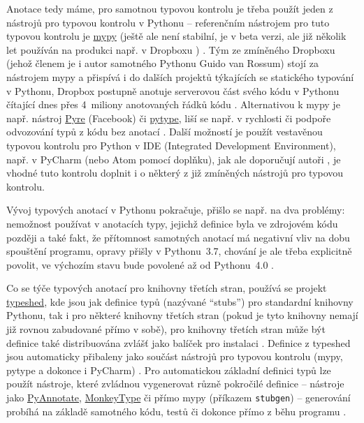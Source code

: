 Anotace tedy máme, pro samotnou typovou kontrolu je třeba použít jeden z nástrojů pro typovou kontrolu v Pythonu -- referenčním nástrojem pro tuto typovou kontrolu je \href{http://mypy-lang.org/}{mypy} (ještě ale není stabilní, je v beta verzi, ale již několik let používán na produkci např. v Dropboxu \cite{mypy}) \cite{types-python-bernat}. Tým ze zmíněného Dropboxu (jehož členem je i autor samotného Pythonu Guido van Rossum) stojí za nástrojem mypy a přispívá i do dalších projektů týkajících se statického typování v Pythonu, Dropbox postupně anotuje serverovou část svého kódu v Pythonu čítající dnes přes 4~miliony anotovaných řádků kódu \cite{types-python-dropbox}. Alternativou k mypy je např. nástroj \href{https://github.com/facebook/pyre-check}{Pyre} (Facebook) či \href{https://github.com/google/pytype}{pytype}, liší se např. v rychlosti či podpoře odvozování typů z kódu bez anotací \cite{types-python-bernat, types-python-realpython}. Další možností je použít vestavěnou typovou kontrolu pro Python v IDE (Integrated Development Environment), např. v PyCharm (nebo Atom pomocí doplňku), jak ale doporučují autoři \cite{types-python-bernat, types-python-medium}, je vhodné tuto kontrolu doplnit i o některý z již zmíněných nástrojů pro typovou kontrolu.

Vývoj typových anotací v Pythonu pokračuje, přišlo se např. na dva problémy: nemožnost používat v anotacích typy, jejichž definice byla ve zdrojovém kódu později a také fakt, že přítomnost samotných anotací má negativní vliv na dobu spouštění programu, opravy přišly v Pythonu~3.7, chování je ale třeba explicitně povolit, ve výchozím stavu bude povolené až od Pythonu~4.0 \cite{python3.7}.

Co se týče typových anotací pro knihovny třetích stran, používá se projekt \href{https://github.com/python/typeshed}{typeshed}, kde jsou jak definice typů (nazývané \enquote{stubs}) pro standardní knihovny Pythonu, tak i pro některé knihovny třetích stran (pokud je tyto knihovny nemají již rovnou zabudované přímo v sobě), pro knihovny třetích stran může být definice také distribuována zvlášť jako balíček pro instalaci \cite{types-python-realpython, mypy-docs}. Definice z typeshed jsou automaticky přibaleny jako součást nástrojů pro typovou kontrolu (mypy, pytype a dokonce i PyCharm) \cite{typeshed}. Pro automatickou základní definici typů lze použít nástroje, které zvládnou vygenerovat různě pokročilé definice -- nástroje jako \href{https://github.com/dropbox/pyannotate}{PyAnnotate}, \href{https://github.com/Instagram/MonkeyType}{MonkeyType} či přímo mypy (příkazem \verb|stubgen|) -- generování probíhá na základě samotného kódu, testů či dokonce přímo z běhu programu \cite{types-python-bernat}.

